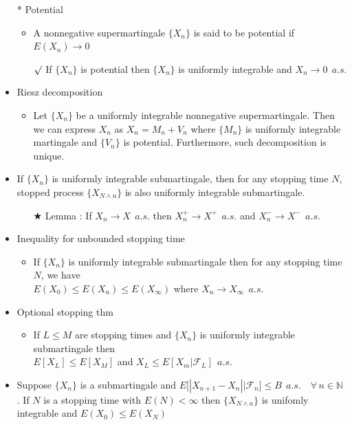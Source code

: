 \documentclass[12pt, A4]{article}
\newcommand{\rmk}{$\surd$}
\newcommand{\trick}{$\bigstar$}
\newcommand{\N}{\mathbb{N}}
\newcommand{\F}{\mathcal{F}}
\newcommand{\foranyn}{\quad \forall \, n\in \N}
\begin{document}
\begin{itemize}
	\item[*] Potential
	\begin{itemize}
		\item A nonnegative supermartingale $\{X_n\}$ is said to be potential if $E(X_n)\rightarrow 0$
		\item[\rmk] If $\{X_n\}$ is potential then $\{X_n\}$ is uniformly integrable and $X_n\rightarrow 0\;\,a.s.$
	\end{itemize} 
	\item Riesz decomposition
	\begin{itemize}
		\item Let $\{X_n\}$ be a uniformly integrable nonnegative supermartingale. Then we can express $X_n$ as $X_n=M_n+V_n$ where $\{M_n\}$ is uniformly integrable martingale and $\{V_n\}$ is potential. Furthermore, such decomposition is unique. 
	\end{itemize}
	\item If $\{X_n\}$ is uniformly integrable submartingale, then for any stopping time $N$, stopped process $\{X_{N\wedge n}\}$ is also uniformly integrable submartingale.
	\begin{itemize}
		\item[\trick] Lemma : If $X_n\rightarrow X\;\, a.s.$ then $X_n^+\rightarrow X^+\;\,a.s.$ and $X_n^-\rightarrow X^-\;\,a.s.$
	\end{itemize}
	\item Inequality for unbounded stopping time
	\begin{itemize}
		\item If $\{X_n\}$ is uniformly integrable submartingale then for any stopping time $N$, we have \\$E(X_0)\leq E(X_n)\leq E(X_\infty)$ where $X_n\rightarrow X_\infty\;\,a.s.$
	\end{itemize}
	\item Optional stopping thm
	\begin{itemize}
		\item If $L\leq M$ are stopping times and $\{X_n\}$ is uniformly integrable submartingale then \\ $E[X_L]\leq E[X_M]$ and $X_L\leq E[X_m|\F_L]\;\,a.s.$
	\end{itemize}
	\item Suppose $\{X_n\}$ is a submartingale and $E\big[|X_{n+1}-X_n| \big|\F_n \big]\leq B\;\,a.s.\foranyn$ .  If $N$ is a stopping time with $E(N)<\infty$ then $\{X_{N\wedge n}\}$ is unifomly integrable and $E(X_0)\leq E(X_N)$
	\begin{itemize}

\end{itemize}
\end{itemize}
\end{document}

